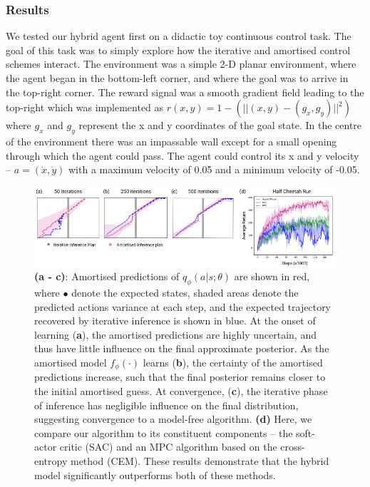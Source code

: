 \subsubsection{Results}

We tested our hybrid agent first on a didactic toy continuous control task. The goal of this task was to simply explore how the iterative and amortised control schemes interact. The environment was a simple 2-D planar environment, where the agent began in the bottom-left corner, and where the goal was to arrive in the top-right corner. The reward signal was a smooth gradient field leading to the top-right which was implemented as $r(x,y) = 1 - (|| (x,y) - (g_x, g_y) ||^2)$ where $g_x$ and $g_y$ represent the x and y coordinates of the goal state. In the centre of the environment there was an impassable wall except for a small opening through which the agent could pass. The agent could control its x and y velocity -- $a = (\dot{x}, \dot{y})$ with a maximum velocity of 0.05 and a minimum velocity of -0.05.

\begin{figure}[t!]
\label{hybrid_performance_figure}
  \centering
  \includegraphics[width=\textwidth]{chapter_4_figures/CHI_figure_one_edit.pdf}
  \caption{\textbf{(a - c)}: Amortised predictions of $q_{\phi}(a|s; \theta)$ are shown in red, where $\bullet$ denote the expected states, shaded areas denote the predicted actions variance at each step, and the expected trajectory recovered by iterative inference is shown in blue.
  At the onset of learning (\textbf{a}), the amortised predictions are highly uncertain, and thus have little influence on the final approximate posterior. As the amortised model $f_{\phi}(\cdot)$ learns (\textbf{b}), the certainty of the amortised predictions increase, such that the final posterior remains closer to the initial amortised guess. At convergence, (\textbf{c}), the iterative phase of inference has negligible influence on the final distribution, suggesting convergence to a model-free algorithm. \textbf{(d)} Here, we compare our algorithm to its constituent components -- the soft-actor critic (SAC) and an MPC algorithm based on the cross-entropy method (CEM). These results demonstrate that the hybrid model significantly outperforms both of these methods.}
  \label{fig:two}
\end{figure}

